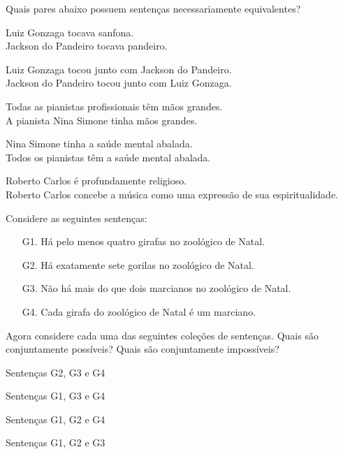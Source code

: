 \problempart Quais pares abaixo possuem sentenças necessariamente equivalentes?

\begin{earg}
\item Luiz Gonzaga tocava sanfona. \\
	Jackson do Pandeiro tocava pandeiro.

\item Luiz Gonzaga tocou junto com Jackson do Pandeiro. \\
	Jackson do Pandeiro tocou junto com Luiz Gonzaga.

\item Todas  as pianistas profissionais têm mãos grandes. \\
	A pianista Nina Simone tinha mãos grandes.

\item Nina Simone tinha a saúde mental abalada. \\
	Todos os pianistas têm a saúde mental abalada.

\item Roberto Carlos é profundamente religioso. \\
	Roberto Carlos concebe a música como uma expressão de sua espiritualidade.
\end{earg}


\noindent \problempart Considere as seguintes sentenças: 
\begin{enumerate}%
\item[G1.] \label{itm:at_least_four} Há pelo menos quatro girafas no zoológico de Natal.
\item[G2.] \label{itm:exactly_seven} Há exatamente sete gorilas no zoológico de Natal.
\item[G3.] \label{itm:not_more_than_two} Não há mais do que dois marcianos no zoológico de Natal.
\item[G4.] \label{itm:martians} Cada girafa do zoológico de Natal é um marciano.
\end{enumerate}

Agora considere cada uma das seguintes coleções de sentenças. Quais são conjuntamente possíveis? Quais são conjuntamente impossíveis?
\begin{earg}
\item Sentenças G2, G3 e G4
\item Sentenças G1, G3 e G4
\item Sentenças G1, G2 e G4
\item Sentenças G1, G2 e G3
\end{earg}

